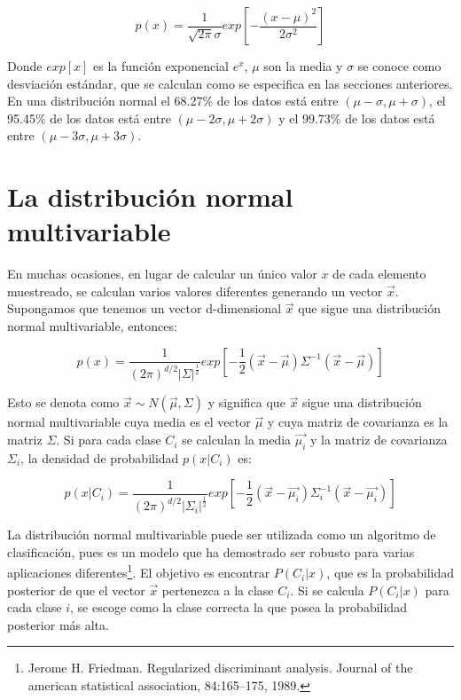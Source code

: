 \documentclass[a4paper, 11pt, oneside]{report}
\begin{document}
	\begin{equation}
		p(x) = \frac{1}{\sqrt{2\pi}\sigma}exp\left[-\frac{(x-\mu)^2}{2\sigma^2}\right]
	\label{eq:normal}
	\end{equation}

Donde $exp[x]$ es la función exponencial $e^x$, $\mu$ son la media y $\sigma$ se conoce como desviación estándar, que se calculan como se especifica en las secciones anteriores. En una distribución normal el 68.27\% de los datos está entre $(\mu-\sigma, \mu+\sigma)$, el 95.45\% de los datos está entre $(\mu-2\sigma, \mu+2\sigma)$ y el 99.73\% de los datos está entre $(\mu-3\sigma, \mu+3\sigma)$.

\section{La distribución normal multivariable}
\label{sect:multivar}

En muchas ocasiones, en lugar de calcular un único valor $x$ de cada elemento muestreado, se calculan varios valores diferentes generando un vector $\vec{x}$. Supongamos que tenemos un vector d-dimensional $\vec{x}$ que sigue una distribución normal multivariable, entonces:

	\begin{equation}\label{eq:multDens}
		p(x) = \frac{1}{(2\pi)^{d/2}|\Sigma|^\frac{1}{2}} exp\left[{-\frac{1}{2}(\vec{x}-\vec{\mu})\Sigma^{-1}(\vec{x}-\vec{\mu})}\right]
	\end{equation}

Esto se denota como $\vec{x} \sim N(\vec{\mu},\Sigma)$ y significa que $\vec{x}$ sigue una distribución normal multivariable cuya media es el vector $\vec{\mu}$ y cuya matriz de covarianza es la matriz $\Sigma$. Si para cada clase $C_i$ se calculan la media $\vec{\mu_i}$ y la matriz de covarianza $\Sigma_i$, la densidad de probabilidad $p(x|C_i)$ es:

	\begin{equation}\label{eq:multivariate}
		p(x|C_i) = \frac{1}{(2\pi)^{d/2}|\Sigma_i|^\frac{1}{2}} exp\left[{-\frac{1}{2}(\vec{x}-\vec{\mu_i})\Sigma_i^{-1}(\vec{x}-\vec{\mu_i})}\right]
	\end{equation}
	
La distribución normal multivariable puede ser utilizada como un algoritmo de clasificación, pues es un modelo que ha demostrado ser robusto para varias aplicaciones diferentes\footnote{Jerome H. Friedman. Regularized discriminant analysis. Journal of the american statistical association, 84:165–175, 1989.}.	El objetivo es encontrar $P(C_i|x)$, que es la probabilidad posterior de que el vector $\vec{x}$ pertenezca a la clase $C_i$. Si se calcula $P(C_i|x)$ para cada clase $i$, se escoge como la clase correcta la que posea la probabilidad posterior más alta.
\end{document}
